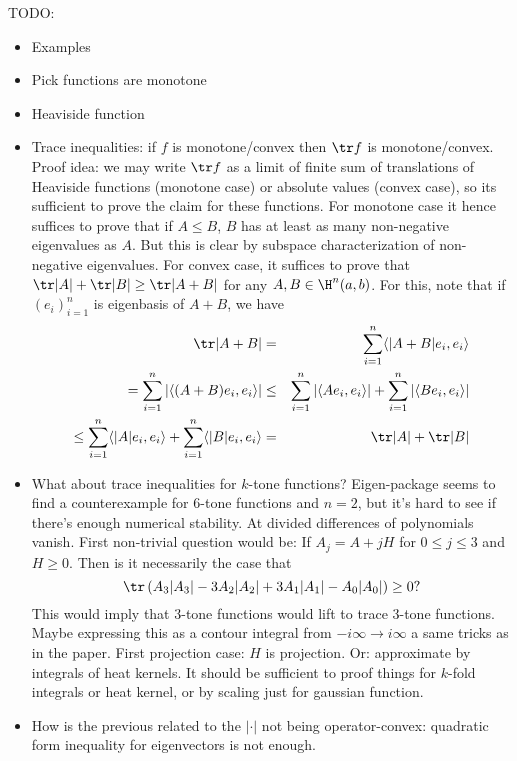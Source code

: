TODO:

\begin{itemize}
	\item Examples
	\item Pick functions are monotone
	\item Heaviside function
	\item Trace inequalities: if $f$ is monotone/convex then $\tr f$ is monotone/convex. Proof idea: we may write $\tr f$ as a limit of finite sum of translations of Heaviside functions (monotone case) or absolute values (convex case), so its sufficient to prove the claim for these functions. For monotone case it hence suffices to prove that if $A \leq B$, $B$ has at least as many non-negative eigenvalues as $A$. But this is clear by subspace characterization of non-negative eigenvalues. For convex case, it suffices to prove that $\tr |A| + \tr |B| \geq \tr |A + B|$ for any $A, B \in \H^{n}(a, b)$. For this, note that if $(e_{i})_{i = 1}^{n}$ is eigenbasis of $A + B$, we have
	\begin{eqnarray*}
		\tr |A + B| &=& \sum_{i = 1}^{n} \langle |A + B| e_{i}, e_{i} \rangle \\
		= \sum_{i = 1}^{n} \left|\langle (A + B) e_{i}, e_{i} \rangle \right| &\leq& \sum_{i = 1}^{n} \left|\langle A e_{i}, e_{i} \rangle \right| + \sum_{i = 1}^{n} \left|\langle B e_{i}, e_{i} \rangle \right| \\
		\leq \sum_{i = 1}^{n} \langle |A| e_{i}, e_{i} \rangle + \sum_{i = 1}^{n} \langle |B| e_{i}, e_{i} \rangle &=& \tr |A| + \tr |B|
	\end{eqnarray*}
	\item What about trace inequalities for $k$-tone functions? Eigen-package seems to find a counterexample for $6$-tone functions and $n = 2$, but it's hard to see if there's enough numerical stability. At divided differences of polynomials vanish. First non-trivial question would be:
	If $A_{j} = A + j H$ for $0 \leq j \leq 3$ and $H \geq 0$. Then is it necessarily the case that
	\[
		\tr \left(A_{3} |A_{3}| - 3 A_{2}|A_{2}| + 3 A_{1} |A_{1}| - A_{0} |A_{0}| \right) \geq 0?
	\]
	This would imply that $3$-tone functions would lift to trace $3$-tone functions. Maybe expressing this as a contour integral from $-i \infty \to i \infty$ a same tricks as in the paper. First projection case: $H$ is projection. Or: approximate by integrals of heat kernels. It should be sufficient to proof things for $k$-fold integrals or heat kernel, or by scaling just for gaussian function.
	\item How is the previous related to the $|\cdot|$ not being operator-convex: quadratic form inequality for eigenvectors is not enough.

\end{itemize}
